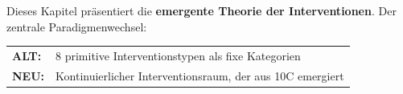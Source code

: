 \begin{tcolorbox}[colback=green!5!white, colframe=green!75!black,
    title=Kapitel\"{u}bersicht]

Dieses Kapitel pr\"{a}sentiert die \textbf{emergente Theorie der Interventionen}. Der zentrale Paradigmenwechsel:

\begin{center}
\begin{tabular}{@{}ll@{}}
\textbf{ALT:} & 8 primitive Interventionstypen als fixe Kategorien \\
\textbf{NEU:} & Kontinuierlicher Interventionsraum, der aus 10C emergiert \\
\end{tabular}
\end{center}


\end{tcolorbox}
